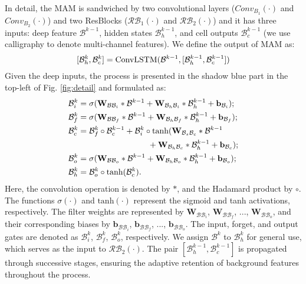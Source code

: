 \documentclass[10pt,journal,compsoc]{IEEEtran}
\begin{document}
In detail, the MAM is sandwiched by two convolutional layers ($Conv_{B_1}(\cdot)$ and $Conv_{B_2}(\cdot)$) and two ResBlocks ($\mathcal{RB}_1(\cdot)$ and $\mathcal{RB}_2(\cdot)$) and it has three inputs: deep feature $\mathcal{B}^{k-1}$, hidden states $\mathcal{B}^{k-1}_h$, and cell outputs $\mathcal{B}^{k-1}_c$ (we use calligraphy to denote multi-channel features). We define the output of MAM as:
\begin{equation}
\setlength{\abovedisplayskip}{1pt}
\setlength{\belowdisplayskip}{1pt}
\centering
     [\mathcal{B}^{k}_h, \mathcal{B}^{k}_c] =\text{ConvLSTM}(\mathcal{B}^{k-1}, [\mathcal{B}^{k-1}_h, \mathcal{B}^{k-1}_c])  
\label{eq:mam}
\end{equation}
Given the deep inputs, the process is presented in the shadow blue part in the top-left of Fig. \ref{fig:detail} and formulated as:
\begin{equation}
\setlength{\abovedisplayskip}{1pt}
\setlength{\belowdisplayskip}{1pt}
\centering
\begin{aligned}
     &\mathcal{B}^{k}_i = \sigma(\mathbf{W}_{{\mathcal{B}}{\mathcal{B}_i}}*\mathcal{B}^{k-1} +\mathbf{W}_{{\mathcal{B}_h}{\mathcal{B}_i}}*{\mathcal{B}^{k-1}_h}+\textbf{b}_{\mathcal{B}_i});\\
     &\mathcal{B}^{k}_f = \sigma(\mathbf{W}_{{\mathcal{B}}{\mathcal{B}_f}}*\mathcal{B}^{k-1} +\mathbf{W}_{{\mathcal{B}_h}{\mathcal{B}_f}}*{\mathcal{B}^{k-1}_h}+\textbf{b}_{\mathcal{B}_f});\\
     &\mathcal{B}^{k}_c = \mathcal{B}^{k}_f \circ \mathcal{B}^{k-1}_{c} + \mathcal{B}^{k}_i \circ \text{tanh}(\mathbf{W}_{{\mathcal{B}_s}{\mathcal{B}_c}}*\mathcal{B}^{k-1} \\
     &~~~~~~~~~~~~~~~~~~~~~~~~~~~~~+\mathbf{W}_{{\mathcal{B}_h}{\mathcal{B}_c}}*{\mathcal{B}^{k-1}_h}+\textbf{b}_{\mathcal{B}_c});\\
     &\mathcal{B}^{k}_o = \sigma(\mathbf{W}_{{\mathcal{B}}{\mathcal{B}_o}}*\mathcal{B}^{k-1} +\mathbf{W}_{{\mathcal{B}_h}{\mathcal{B}_o}}*{\mathcal{B}^{k-1}_h}+\textbf{b}_{\mathcal{B}_o});\\
     &\mathcal{B}^{k}_h = \mathcal{B}^{k}_o \circ \text{tanh}(\mathcal{B}^{k}_c).
\end{aligned}
\label{eq:lstm}
\end{equation}
Here, the convolution operation is denoted by $*$, and the Hadamard product by $\circ$. The functions $\sigma(\cdot)$ and $\text{tanh}(\cdot)$ represent the sigmoid and tanh activations, respectively. The filter weights are represented by $\mathbf{W}_{\mathcal{B}\mathcal{B}_i}$, $\mathbf{W}_{\mathcal{B}\mathcal{B}_f}$, ..., $\mathbf{W}_{\mathcal{B}\mathcal{B}_o}$, and their corresponding biases by $\mathbf{b}_{\mathcal{B}\mathcal{B}_i}$, $\mathbf{b}_{\mathcal{B}\mathcal{B}_f}$, ..., $\mathbf{b}_{\mathcal{B}\mathcal{B}_o}$. The input, forget, and output gates are denoted as $\mathcal{B}^{k}_i$, $\mathcal{B}^{k}_f$, $\mathcal{B}^{k}_o$, respectively. We assign $\mathcal{B}^{k}$ to $\mathcal{B}^{k}_h$ for general use, which serves as the input to $\mathcal{RB}_2(\cdot)$. The pair $[\mathcal{B}^{k-1}_h, \mathcal{B}^{k-1}_c]$ is propagated through successive stages, ensuring the adaptive retention of background features throughout the process.
\end{document}
